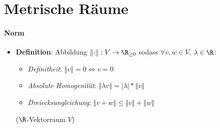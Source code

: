 \section{Metrische Räume}

\paragraph{Norm}
\begin{itemize}
  \item \textbf{Definition}: Abbildung \( \left\Vert \cdot \right\Vert: V \to \R_{\geq 0} \) sodass \( \forall v,w \in V \), \( \lambda \in \R \):
  \begin{itemize}
    \item \emph{Definitheit}: \( \left\Vert v \right\Vert = 0 \Leftrightarrow v = 0 \)
    \item \emph{Absolute Homogenität}: \( \left\Vert \lambda v \right\Vert = \left\vert \lambda \right\vert * \left\Vert v \right\Vert \)
    \item \emph{Dreiecksungleichung}: \( \left\Vert v + w \right\Vert \leq \left\Vert v \right\Vert + \left\Vert w \right\Vert \)
  \end{itemize}
  (\( \R \)-Vektorraum \( V \))
\end{itemize}

